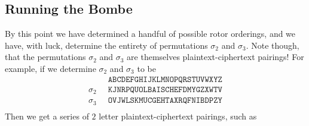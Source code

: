   \subsection{Running the Bombe}
  By this point we have determined a handful of possible rotor
  orderings, and we have, with luck, determine the entirety of
  permutations $\sigma_2$ and $\sigma_3$. Note though, that the
  permutations $\sigma_2$ and $\sigma_3$ are themselves
  plaintext-ciphertext pairings! For example, if we determine
  $\sigma_2$ and $\sigma_3$ to be
  \begin{align*}
    & \texttt{ABCDEFGHIJKLMNOPQRSTUVWXYZ} \\
    \sigma_2\;\; & \texttt{KJNRPQUOLBAISCHEFDMYGZXWTV} \\
    \sigma_3\;\; & \texttt{OVJWLSKMUCGEHTAXRQFNIBDPZY} \\
  \end{align*}
  Then we get a series of $2$ letter plaintext-ciphertext pairings, such as

